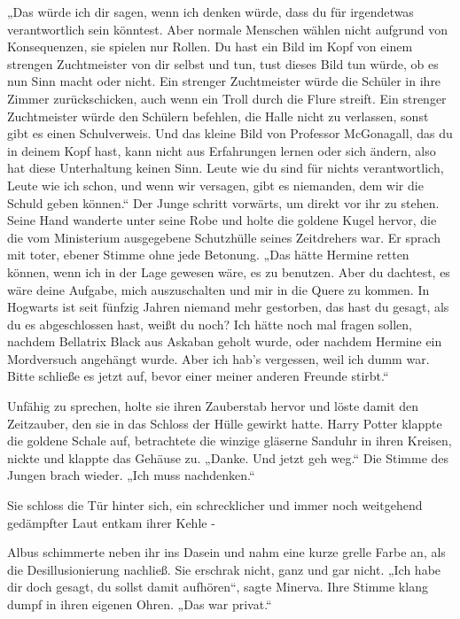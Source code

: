 {„Das würde ich dir sagen, wenn ich denken würde, dass du für irgendetwas verantwortlich sein könntest. Aber normale Menschen wählen nicht aufgrund von Konsequenzen, sie spielen nur Rollen. Du hast ein Bild im Kopf von einem strengen Zuchtmeister von dir selbst und tun, tust dieses Bild tun würde, ob es nun Sinn macht oder nicht. Ein strenger Zuchtmeister würde die Schüler in ihre Zimmer zurückschicken, auch wenn ein Troll durch die Flure streift. Ein strenger Zuchtmeister würde den Schülern befehlen, die Halle nicht zu verlassen, sonst gibt es einen Schulverweis. Und das kleine Bild von Professor McGonagall, das du in deinem Kopf hast, kann nicht aus Erfahrungen lernen oder sich ändern, also hat diese Unterhaltung keinen Sinn. Leute wie du sind für nichts verantwortlich, Leute wie ich schon, und wenn wir versagen, gibt es niemanden, dem wir die Schuld geben können.“ Der Junge schritt vorwärts, um direkt vor ihr zu stehen. Seine Hand wanderte unter seine Robe und holte die goldene Kugel hervor, die die vom Ministerium ausgegebene Schutzhülle seines Zeitdrehers war. Er sprach mit toter, ebener Stimme ohne jede Betonung. „Das hätte Hermine retten können, wenn ich in der Lage gewesen wäre, es zu benutzen. Aber du dachtest, es wäre deine Aufgabe, mich auszuschalten und mir in die Quere zu kommen. In Hogwarts ist seit fünfzig Jahren niemand mehr gestorben, das hast du gesagt, als du es abgeschlossen hast, weißt du noch? Ich hätte noch mal fragen sollen, nachdem Bellatrix Black aus Askaban geholt wurde, oder nachdem Hermine ein Mordversuch angehängt wurde. Aber ich hab's vergessen, weil ich dumm war. Bitte schließe es jetzt auf, bevor einer meiner anderen Freunde stirbt.“

Unfähig zu sprechen, holte sie ihren Zauberstab hervor und löste damit den Zeitzauber, den sie in das Schloss der Hülle gewirkt hatte. Harry Potter klappte die goldene Schale auf, betrachtete die winzige gläserne Sanduhr in ihren Kreisen, nickte und klappte das Gehäuse zu. „Danke. Und jetzt geh weg.“ Die Stimme des Jungen brach wieder. „Ich muss nachdenken.“

Sie schloss die Tür hinter sich, ein schrecklicher und immer noch weitgehend gedämpfter Laut entkam ihrer Kehle -

Albus schimmerte neben ihr ins Dasein und nahm eine kurze grelle Farbe an, als die Desillusionierung nachließ. Sie erschrak nicht, ganz und gar nicht. „Ich habe dir doch gesagt, du sollst damit aufhören“, sagte Minerva. Ihre Stimme klang dumpf in ihren eigenen Ohren. „Das war privat.“

}
